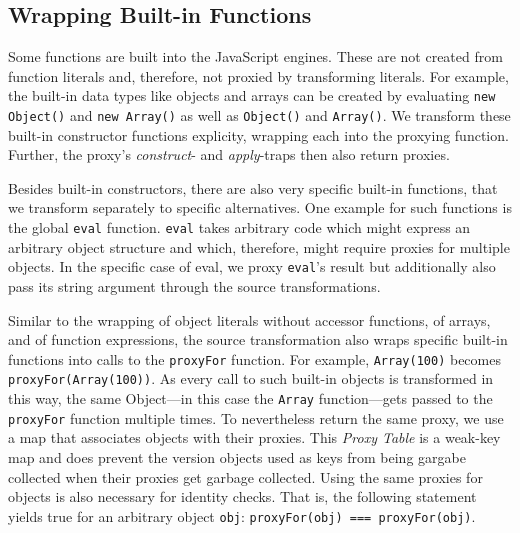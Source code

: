 \subsection{Wrapping Built-in Functions}

Some functions are built into the JavaScript engines.
These are not created from function literals and, therefore, not proxied by transforming literals.
For example, the built-in data types like objects and arrays can be created by evaluating \lstinline{new Object()} and \lstinline{new Array()} as well as \lstinline{Object()} and \lstinline{Array()}.
We transform these built-in constructor functions explicity, wrapping each into the proxying function.
Further, the proxy's \emph{construct}- and \emph{apply}-traps then also return proxies.

Besides built-in constructors, there are also very specific built-in functions, that we transform separately to specific alternatives.
One example for such functions is the global \lstinline{eval} function.
\lstinline{eval} takes arbitrary code which might express an arbitrary object structure and which, therefore, might require proxies for multiple objects.
In the specific case of eval, we proxy \lstinline{eval}'s result but additionally also pass its string argument through the source transformations.

Similar to the wrapping of object literals without accessor functions, of arrays, and of function expressions, the source transformation also wraps specific built-in functions into calls to the \lstinline{proxyFor} function.
For example, \lstinline{Array(100)} becomes \lstinline{proxyFor(Array(100))}.
As every call to such built-in objects is transformed in this way, the same Object---in this case the \lstinline{Array} function---gets passed to the \lstinline{proxyFor} function multiple times.
To nevertheless return the same proxy, we use a map that associates objects with their proxies.
This \emph{Proxy Table} is a weak-key map and does prevent the version objects used as keys from being gargabe collected when their proxies get garbage collected.
Using the same proxies for objects is also necessary for identity checks.
That is, the following statement yields true for an arbitrary object \lstinline{obj}: \lstinline{proxyFor(obj) === proxyFor(obj)}.



